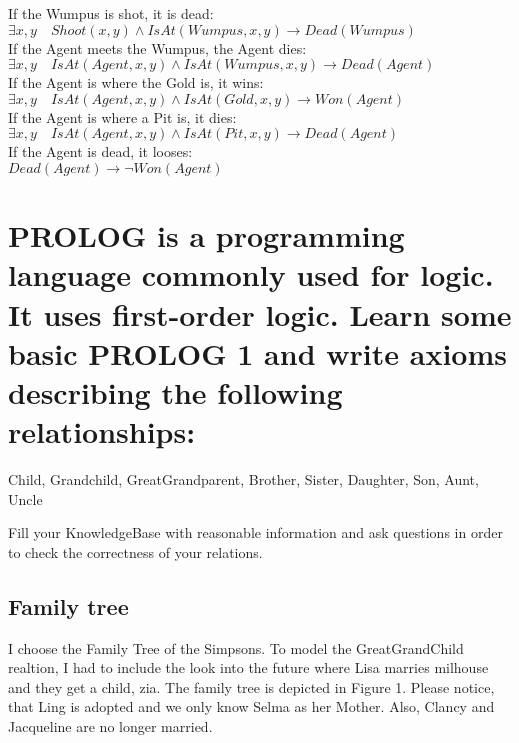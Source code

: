 \documentclass{scrartcl}
\begin{document}
If the Wumpus is shot, it is dead:\\
$\exists x, y \quad Shoot(x, y) \land IsAt(Wumpus, x, y) \to Dead(Wumpus)$\\

If the Agent meets the Wumpus, the Agent dies:\\
$\exists x, y \quad IsAt(Agent, x, y) \land IsAt(Wumpus, x, y) \to Dead(Agent)$\\

If the Agent is where the Gold is, it wins:\\
$\exists x, y \quad IsAt(Agent, x, y) \land IsAt(Gold, x, y) \to Won(Agent)$\\

If the Agent is where a Pit is, it dies:\\
$\exists x, y \quad IsAt(Agent, x, y) \land IsAt(Pit, x, y) \to Dead(Agent)$\\

If the Agent is dead, it looses:\\
$Dead(Agent) \to \neg Won(Agent)$\\


\section{PROLOG is a programming language commonly used for logic. It uses first-order
logic. Learn some basic PROLOG 1 and write axioms describing the following relationships:}

Child, Grandchild, GreatGrandparent, Brother, Sister, Daughter, Son, Aunt, Uncle

Fill your KnowledgeBase with reasonable information and ask questions in order to check the correctness of your relations.

\subsection{Family tree}
I choose the Family Tree of the Simpsons. To model the GreatGrandChild realtion, I had to include the look into the future where Lisa marries milhouse and they get a child, zia. The family tree is depicted in Figure 1. Please notice, that Ling is adopted and we only know Selma as her Mother. Also, Clancy and Jacqueline are no longer married.

\end{document}
